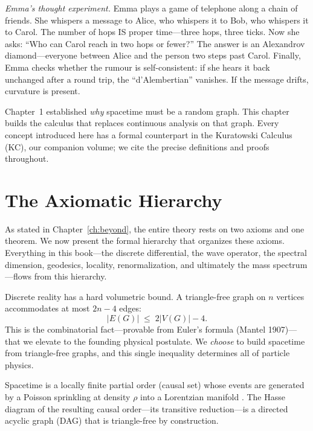 \documentclass[11pt, a4paper, openany]{book}
\begin{document}
\smallskip\noindent
\textit{Emma's thought experiment.}
Emma plays a game of telephone along a chain of friends. She whispers a
message to Alice, who whispers it to Bob, who whispers it to Carol. The
number of hops IS proper time---three hops, three ticks. Now she asks:
``Who can Carol reach in two hops or fewer?'' The answer is an Alexandrov
diamond---everyone between Alice and the person two steps past Carol.
Finally, Emma checks whether the rumour is self-consistent: if she hears
it back unchanged after a round trip, the ``d'Alembertian'' vanishes.
If the message drifts, curvature is present.
\smallskip

\noindent
Chapter~1 established \emph{why} spacetime must be a random graph. This
chapter builds the calculus that replaces continuous analysis on that
graph. Every concept introduced here has a formal counterpart in the
Kuratowski Calculus (KC), our companion volume; we cite the precise
definitions and proofs throughout.

\section{The Axiomatic Hierarchy}\label{sec:axiomatic-hierarchy}

As stated in Chapter~\ref{ch:beyond}, the entire theory rests on two
axioms and one theorem. We now present the formal hierarchy that
organizes these axioms. Everything in this book---the discrete
differential, the wave operator, the spectral dimension, geodesics,
locality, renormalization, and ultimately the mass spectrum---flows from
this hierarchy.

\begin{axiom}
\label{ax:volumetric-limit}
Discrete reality has a hard volumetric bound. A triangle-free graph
on $n$ vertices accommodates at most $2n - 4$ edges:
\begin{equation}
\label{eq:axiom0-vol-limit}
  |E(G)| \;\leq\; 2|V(G)| - 4.
\end{equation}
This is the combinatorial fact---provable from Euler's formula (Mantel
1907)---that we elevate to the founding physical postulate. We
\emph{choose} to build spacetime from triangle-free graphs, and this
single inequality determines all of particle physics.
\end{axiom}

\begin{axiom}
\label{ax:poisson-causality}
Spacetime is a locally finite partial order (causal set) whose events
are generated by a Poisson sprinkling at density $\rho$ into a
Lorentzian manifold \cite{bombelli1987,sorkin2003}. The Hasse
diagram of the resulting causal order---its transitive reduction---is
a directed acyclic graph (DAG) that is triangle-free by construction.
\end{axiom}
\end{document}
